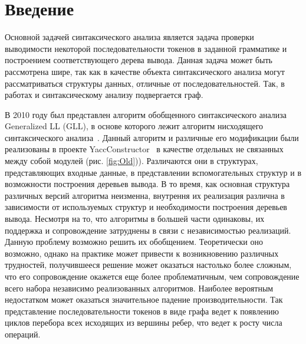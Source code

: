 \documentclass[14pt]{matmex-diploma}
\begin{document}
\maketitle
\tableofcontents

\section*{Введение}
Основной задачей синтаксического анализа является задача проверки выводимости некоторой последовательности токенов в заданной грамматике и построением соответствующего дерева вывода. Данная задача может быть рассмотрена шире, так как в качестве объекта синтаксического анализа могут рассматриваться структуры данных, отличные от последовательностей. Так, в работах \cite{graphParseVerb} и \cite{graphParseRag} синтаксическому анализу подвергается граф.

В 2010 году был представлен алгоритм обобщенного синтаксического анализа Generalized LL (GLL), в основе которого лежит алгоритм нисходящего синтаксического анализа~\cite{GLLParsing}. Данный алгоритм и различные его модификации были реализованы в проекте YaccConstructor~\cite{YaccConstructor} в качестве отдельных не связанных между собой модулей (рис. \ref{fig:Old})). Различаются они в структурах, представляющих входные данные, в представлении вспомогательных структур и в возможности построения деревьев вывода. В то время, как основная структура различных версий алгоритма неизменна, внутрення их реализация различна в зависимости от используемых структур и необходимости построения деревьев вывода. Несмотря на то, что алгоритмы в большей части одинаковы, их поддержка и сопровождение затруднены в связи с независимостью реализаций. Данную проблему возможно решить их обобщением. Теоретически оно возможно, однако на практике может привести к возникновению различных трудностей, получившееся решение может оказаться настолько более сложным, что его сопровождение окажется еще более проблематичным, чем сопровождение всего набора независимо реализованных алгоритмов. Наиболее вероятным недостатком может оказаться значительное падение производительности. Так представление последовательности токенов в виде графа ведет к появлению циклов перебора всех исходящих из вершины ребер, что ведет к росту числа операций.
\end{document}
